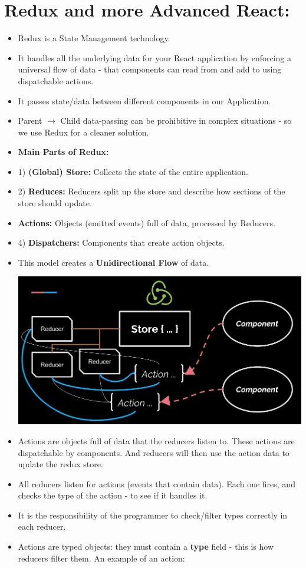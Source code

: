 \documentclass[8pt,a4paper]{extarticle}
\begin{document}
\section*{Redux and more Advanced React:}

\begin{itemize}
\item Redux is a State Management technology.
\item It handles all the underlying data for your React application by enforcing a universal flow of data - that components can read from and add to using dispatchable actions.
\item It passes state/data between different components in our Application. 
\item Parent $\rightarrow$ Child data-passing can be prohibitive in complex situations - so we use Redux for a cleaner solution.
\item \textbf{Main Parts of Redux:}
\item 1) \textbf{(Global) Store:} Collects the state of the entire application.
\item 2) \textbf{Reduces:} Reducers split up the store and describe how sections of the store should update.
\item \textbf{Actions:} Objects (emitted events) full of data, processed by Reducers.
\item 4) \textbf{Dispatchers:} Components that create action objects.
\item This model creates a \textbf{Unidirectional Flow} of data.

\includegraphics[scale=0.25]{redux_chart.png}

\item Actions are objects full of data that the reducers listen to. These actions are dispatchable by components. And reducers will then use the action data to update the redux store.
\item All reducers listen for actions (events that contain data). Each one fires, and checks the type of the action - to see if it handles it.
\item It is the responsibility of the programmer to check/filter types correctly in each reducer.
\item Actions are typed objects: they must contain a \textbf{type} field - this is how reducers filter them. An example of an action:


\end{itemize}
\end{document}
